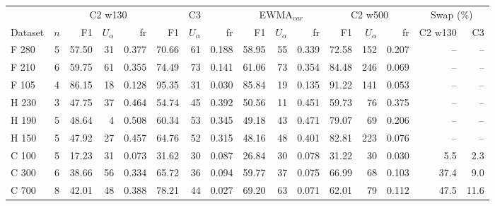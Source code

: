 \begin{tabular}{lcrrrrrrrrrrrrrr}
\hline
 & & \multicolumn{3}{c}{C2 w130} & \multicolumn{3}{c}{C3} & \multicolumn{3}{c}{EWMA$_{var}$} & \multicolumn{3}{c}{C2 w500} & \multicolumn{2}{c}{Swap (\%)} \\
Dataset & $n$ & F1 & $U_\alpha$ & fr & F1 & $U_\alpha$ & fr & F1 & $U_\alpha$ & fr & F1 & $U_\alpha$ & fr & C2 w130 & C3 \\ \hline
F  280 & 5 & 57.50 & 31 & 0.377 & 70.66 & 61 & 0.188 & 58.95 & 55 & 0.339 & 72.58 & 152 & 0.207 & -- & -- \\
F  210 & 6 & 59.75 & 61 & 0.355 & 74.49 & 73 & 0.141 & 61.06 & 73 & 0.354 & 84.48 & 246 & 0.069 & -- & -- \\
F  105 & 4 & 86.15 & 18 & 0.128 & 95.35 & 31 & 0.030 & 85.84 & 19 & 0.135 & 91.22 & 141 & 0.053 & -- & -- \\
H  230 & 3 & 47.75 & 37 & 0.464 & 54.74 & 45 & 0.392 & 50.56 & 11 & 0.451 & 59.73 & 76 & 0.375 & -- & -- \\
H  190 & 5 & 48.64 & 4 & 0.508 & 60.34 & 53 & 0.345 & 49.18 & 43 & 0.471 & 79.07 & 69 & 0.206 & -- & -- \\
H  150 & 5 & 47.92 & 27 & 0.457 & 64.76 & 52 & 0.315 & 48.16 & 48 & 0.401 & 82.81 & 223 & 0.076 & -- & -- \\
C  100 & 5 & 17.23 & 31 & 0.073 & 31.62 & 30 & 0.087 & 26.84 & 30 & 0.078 & 31.22 & 30 & 0.030 & 5.5 & 2.3 \\
C  300 & 6 & 38.66 & 56 & 0.334 & 65.72 & 36 & 0.094 & 59.77 & 37 & 0.075 & 66.99 & 68 & 0.103 & 37.4 & 9.0 \\
C  700 & 8 & 42.01 & 48 & 0.388 & 78.21 & 44 & 0.027 & 69.20 & 63 & 0.071 & 62.01 & 79 & 0.112 & 47.5 & 11.6 \\
\hline
\end{tabular}
